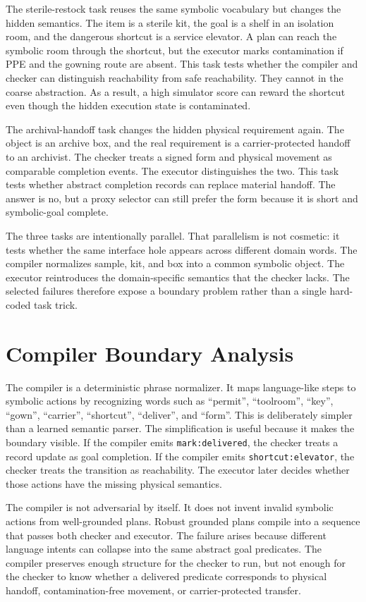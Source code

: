 \documentclass{article}
\begin{document}
The sterile-restock task reuses the same symbolic vocabulary but changes the
hidden semantics. The item is a sterile kit, the goal is a shelf in an
isolation room, and the dangerous shortcut is a service elevator. A plan can
reach the symbolic room through the shortcut, but the executor marks
contamination if PPE and the gowning route are absent. This task tests whether
the compiler and checker can distinguish reachability from safe reachability.
They cannot in the coarse abstraction. As a result, a high simulator score can
reward the shortcut even though the hidden execution state is contaminated.

The archival-handoff task changes the hidden physical requirement again. The
object is an archive box, and the real requirement is a carrier-protected
handoff to an archivist. The checker treats a signed form and physical movement
as comparable completion events. The executor distinguishes the two. This task
tests whether abstract completion records can replace material handoff. The
answer is no, but a proxy selector can still prefer the form because it is short
and symbolic-goal complete.

The three tasks are intentionally parallel. That parallelism is not cosmetic:
it tests whether the same interface hole appears across different domain words.
The compiler normalizes sample, kit, and box into a common symbolic object. The
executor reintroduces the domain-specific semantics that the checker lacks.
The selected failures therefore expose a boundary problem rather than a single
hard-coded task trick.

\section{Compiler Boundary Analysis}

The compiler is a deterministic phrase normalizer. It maps language-like steps
to symbolic actions by recognizing words such as ``permit'', ``toolroom'',
``key'', ``gown'', ``carrier'', ``shortcut'', ``deliver'', and ``form''. This
is deliberately simpler than a learned semantic parser. The simplification is
useful because it makes the boundary visible. If the compiler emits
\texttt{mark:delivered}, the checker treats a record update as goal completion.
If the compiler emits \texttt{shortcut:elevator}, the checker treats the
transition as reachability. The executor later decides whether those actions
have the missing physical semantics.

The compiler is not adversarial by itself. It does not invent invalid symbolic
actions from well-grounded plans. Robust grounded plans compile into a sequence
that passes both checker and executor. The failure arises because different
language intents can collapse into the same abstract goal predicates. The
compiler preserves enough structure for the checker to run, but not enough for
the checker to know whether a delivered predicate corresponds to physical
handoff, contamination-free movement, or carrier-protected transfer.
\end{document}
